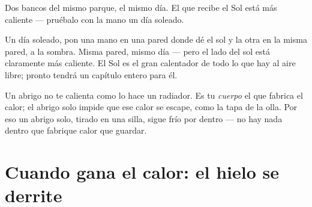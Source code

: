 \begin{omfigure}

{\small Dos bancos del mismo parque, el mismo día. El que recibe el
Sol está más caliente --- pruébalo con la mano un día soleado.}
\end{omfigure}

\begin{example}\label{ex:g1:hot-and-cold:sunshade}
Un día soleado, pon una mano en una pared donde dé el sol y la otra en
la misma pared, a la sombra. Misma pared, mismo día --- pero el lado
del sol está claramente más caliente. El Sol es el gran calentador de
todo lo que hay al aire libre; pronto tendrá un capítulo entero para
él.
\end{example}

\begin{remark}\label{rem:g1:hot-and-cold:coat}
Un abrigo no te calienta como lo hace un radiador. Es tu \emph{cuerpo}
el que fabrica el calor; el abrigo solo impide que ese calor se
escape, como la tapa de la olla. Por eso un abrigo solo, tirado en una
silla, sigue frío por dentro --- no hay nada dentro que fabrique calor
que guardar.
\end{remark}

\section{Cuando gana el calor: el hielo se derrite}

